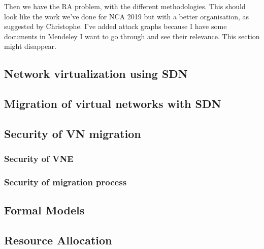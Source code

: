 \documentclass[a4paper, 11pt]{article}
\begin{document}
Then we have the RA problem, with the different methodologies. This should look like the work we've done for NCA 2019 but with a better organisation, as suggested by Christophe. I've added attack graphs because I have some documents in Mendeley I want to go through and see their relevance. This section might disappear.


\subsection{Network virtualization using SDN}









\subsection{Migration of virtual networks with SDN}



\subsection{Security of VN migration}

\subsubsection{Security of VNE}
\cite{Wang2015,safevne-bays2012,Boutigny2018,Bays2014}
\subsubsection{Security of migration process}


\subsection{Formal Models}
\cite{M2D2-Morin2002,AICPub2006:2015,HLPSL-Chevalier2004,Marsalek2018,ISO/IEC270012013,abstraction-reitblatt2012,validation-naylor1967,M4D4-Morin2008,CSP-Schneider1996}





\subsection{Resource Allocation}
\end{document}
